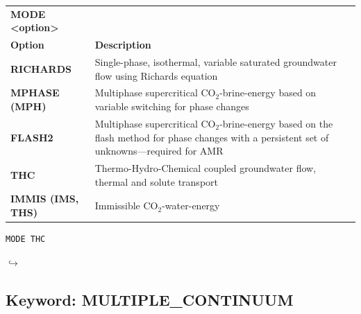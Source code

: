 \documentclass[12pt]{article}
\newcommand\return{{\hfill$\hookrightarrow$}}
\begin{document}

\begin{tabularx}{\linewidth}{lX}
\bf MODE <option>\\
\bf Option & \bf Description\\
\bf RICHARDS &Single-phase, isothermal, variable saturated groundwater flow using Richards equation\\
\bf MPHASE (MPH) &Multiphase supercritical CO$_2$-brine-energy based on variable switching for phase changes\\
\bf FLASH2 &Multiphase supercritical CO$_2$-brine-energy based on the flash method for phase changes with a persistent set of unknowns---required for AMR\\
\bf THC &Thermo-Hydro-Chemical coupled groundwater flow, thermal and solute transport\\
\bf IMMIS (IMS, THS) &Immissible CO$_2$-water-energy\\
\end{tabularx}

\begin{verbatim}
MODE THC
\end{verbatim}

\hyperlink{target_key}{\return}


\newpage
\protect\hypertarget{target_mc}{}

\subsection{Keyword: MULTIPLE\_CONTINUUM}
\end{document}
